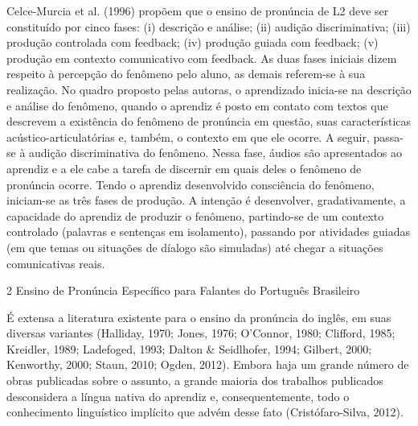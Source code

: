 Celce-Murcia et al. (1996) prop\~oem que o ensino de pron\'uncia de L2 deve
ser constitu\'ido por cinco fases: (i) descri\c{c}\~ao e an\'alise; (ii) audi\c{c}\~ao
discriminativa; (iii) produ\c{c}\~ao controlada com feedback; (iv) produ\c{c}\~ao
guiada com feedback; (v) produ\c{c}\~ao em contexto comunicativo com feedback.
As duas fases iniciais dizem respeito à percep\c{c}\~ao do fen\^omeno pelo
aluno, as demais referem-se à sua realiza\c{c}\~ao. No quadro proposto pelas
autoras, o aprendizado inicia-se na descri\c{c}\~ao e an\'alise do fen\^omeno,
quando o aprendiz \'e posto em contato com textos que descrevem a
exist\^encia do fen\^omeno de pron\'uncia em quest\~ao, suas caracter\'isticas
ac\'ustico-articulat\'orias e, tamb\'em, o contexto em que ele ocorre. A
seguir, passa-se à audi\c{c}\~ao discriminativa do fen\^omeno. Nessa fase,
\'audios s\~ao apresentados ao aprendiz e a ele cabe a tarefa de discernir
em quais deles o fen\^omeno de pron\'uncia ocorre. Tendo o aprendiz
desenvolvido consci\^encia do fen\^omeno, iniciam-se as tr\^es fases de
produ\c{c}\~ao. A inten\c{c}\~ao \'e desenvolver, gradativamente, a capacidade do
aprendiz de produzir o fen\^omeno, partindo-se de um contexto controlado
(palavras e senten\c{c}as em isolamento), passando por atividades guiadas
(em que temas ou situa\c{c}\~oes de d\'ialogo s\~ao simuladas) at\'e chegar a
situa\c{c}\~oes comunicativas reais.

2 Ensino de Pron\'uncia Espec\'ifico para Falantes do Portugu\^es Brasileiro

\'E extensa a literatura existente para o ensino da pron\'uncia do ingl\^es,
em suas diversas variantes (Halliday, 1970; Jones, 1976; O'Connor, 1980;
Clifford, 1985; Kreidler, 1989; Ladefoged, 1993; Dalton \& Seidlhofer,
1994; Gilbert, 2000; Kenworthy, 2000; Staun, 2010; Ogden, 2012). Embora
haja um grande n\'umero de obras publicadas sobre o assunto, a grande
maioria dos trabalhos publicados desconsidera a l\'ingua nativa do
aprendiz e, consequentemente, todo o conhecimento lingu\'istico impl\'icito
que adv\'em desse fato (Crist\'ofaro-Silva, 2012).

